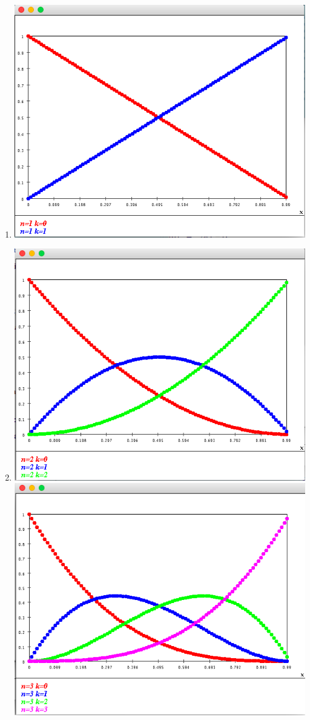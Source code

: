\documentclass{article}
\begin{document}
\begin{enumerate}
\item 
\includegraphics[scale=0.4]{bernstein_1}

\item 
\includegraphics[scale=0.3]{bernstein_2}
\includegraphics[scale=0.3]{bernstein_3}


\end{enumerate}
\end{document}
